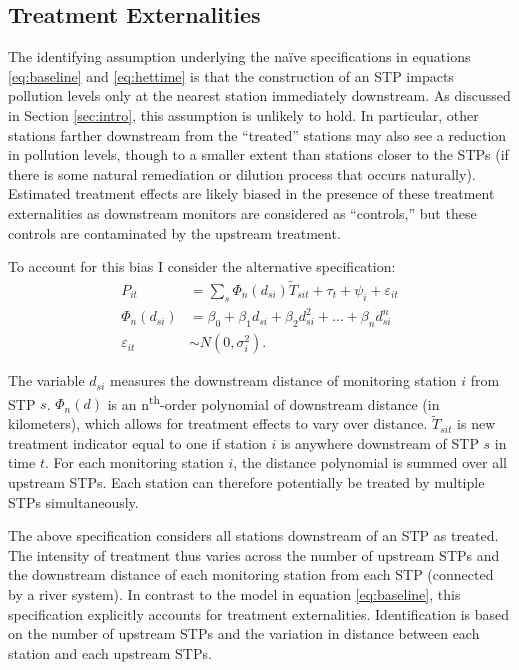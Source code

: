 \documentclass[12pt]{article}
\newcommand{\e}{\varepsilon}
\newcommand{\anum}[1]{\begin{align}#1\end{align}}
\begin{document}
\subsection{Treatment Externalities} \label{sec:ols_poly}

The identifying assumption underlying the na\"{i}ve specifications in equations \eqref{eq:baseline} and \eqref{eq:hettime} is that the construction of an STP impacts pollution levels only at the nearest station immediately downstream. As discussed in Section \ref{sec:intro}, this assumption is unlikely to hold. In particular, other stations farther downstream from the ``treated'' stations may also see a reduction in pollution levels, though to a smaller extent than stations closer to the STPs (if there is some natural remediation or dilution process that occurs naturally). Estimated treatment effects are likely biased in the presence of these treatment externalities as downstream monitors are considered as ``controls,'' but these controls are contaminated by the upstream treatment.

To account for this bias I consider the alternative specification:
\begin{subequations}
\anum{
	P_{it} &=  \sum_{s} \Phi_n(d_{si})\widetilde{T}_{s i t} + \tau_t + \psi_i + \e_{it} \label{eq:treatext} \\
	\Phi_n(d_{si}) &= \beta_0 + \beta_1 d_{si} + \beta_2 d_{si}^2 + \dots + \beta_n d_{si}^n \label{eq:poly} \\
	\e_{it} &\sim N(0, \sigma^2_i).\nonumber
}
\end{subequations}

The variable $d_{si}$ measures the downstream distance of monitoring station $i$ from STP $s$. $\Phi_n(d)$ is an n\textsuperscript{th}-order polynomial of downstream distance (in kilometers), which allows for treatment effects to vary over distance. $\widetilde{T}_{sit}$ is new treatment indicator equal to one if station $i$ is anywhere downstream of STP $s$ in time $t$. For each monitoring station $i$, the distance polynomial is summed over all upstream STPs. Each station can therefore potentially be treated by multiple STPs simultaneously. 

The above specification considers all stations downstream of an STP as treated. The intensity of treatment thus varies across the number of upstream STPs and the downstream distance of each monitoring station from each STP (connected by a river system). In contrast to the model in equation \eqref{eq:baseline}, this specification explicitly accounts for treatment externalities. Identification is based on the number of upstream STPs and the variation in distance between each station and each upstream STPs. 
\end{document}
